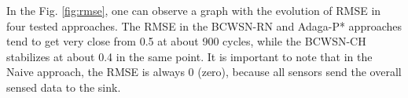 \documentclass[conference]{IEEEtran}
\begin{document}
% 
% 

In the Fig. \ref{fig:rmse}, one can observe a graph with the evolution of RMSE
in four tested approaches. The RMSE in the BCWSN-RN and Adaga-P* approaches tend
to get very close from 0.5 at about 900 cycles, while the BCWSN-CH stabilizes at
about 0.4 in the same point. It is important to note that in the Naive approach,
the RMSE is always 0 (zero), because all sensors send the overall sensed data to
the sink.
\end{document}
